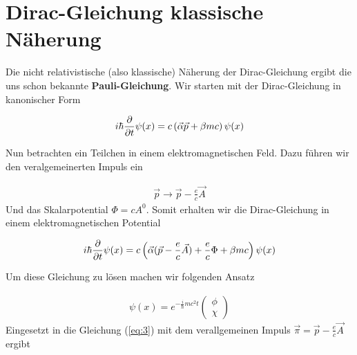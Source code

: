 
\usepackage{amsmath} 





\section*{Dirac-Gleichung klassische Näherung}

Die nicht relativistische (also klassische) Näherung der Dirac-Gleichung ergibt die uns schon bekannte \textbf{Pauli-Gleichung}. Wir starten mit der Dirac-Gleichung in kanonischer Form

\begin{align}
  \label{eq:1}
  i\hbar\pdiff_t \psi(x) = c\left(\vec \alpha \vec p +\beta mc  \right)\psi(x)
\end{align}

Nun betrachten ein Teilchen in einem elektromagnetischen Feld. Dazu führen wir den veralgemeinerten Impuls ein

\begin{align}
  \label{eq:2}
  \vec p \rightarrow \vec p - \frac{e}{c}\vec A
\end{align}
Und das Skalarpotential \(\Phi=cA^{0}\). Somit erhalten wir die Dirac-Gleichung in einem elektromagnetischen Potential

\begin{align}
  \label{eq:3}
  i\hbar\pdiff_t \psi(x) = c\left(\vec \alpha (\vec p - \frac{e}{c}\vec A) + \frac{e}{c}\Phi   +\beta mc  \right)\psi(x)
\end{align}

Um diese Gleichung zu lösen machen wir folgenden Ansatz

\begin{align}
  \label{eq:4}
  \psi(x) = e^{-\frac{i}{\hbar}mc^2 t} \begin{pmatrix}  \phi\\\chi \end{pmatrix}
\end{align}
Eingesetzt in die Gleichung (\ref{eq:3}) mit dem verallgemeinen Impuls \(\vec\pi = \vec p - \frac{e}{c}\vec A \) ergibt

